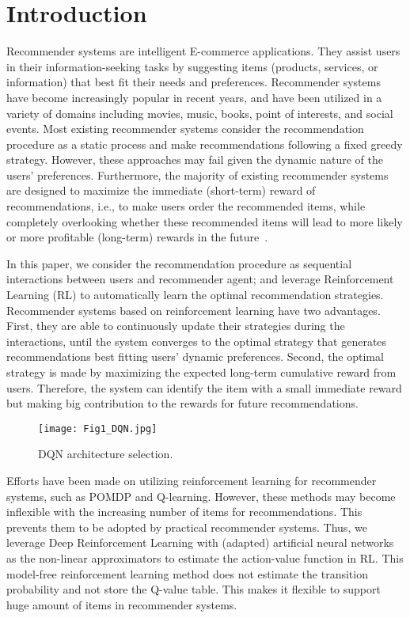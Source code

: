 \section{Introduction}
\label{sec:introduction}
Recommender systems are intelligent E-commerce applications. They assist users in their information-seeking tasks by suggesting items (products, services, or information) that best fit their needs and preferences. Recommender systems have become increasingly popular in recent years, and have been utilized in a variety of domains including movies, music, books, point of interests, and social events\cite{zhao2019model,resnick1997recommender,ricci2011introduction,zhao2016exploring,zhao2018recommendations,zhao2018deep,zhao2018reinforcement,guo2016cosolorec}. Most existing recommender systems consider the recommendation procedure as a static process and make recommendations following a fixed greedy strategy. However, these approaches may fail given the dynamic nature of the users' preferences. Furthermore, the majority of existing recommender systems are designed to maximize the immediate (short-term) reward of recommendations, i.e., to make users order the recommended items, while completely overlooking whether these recommended items will lead to more likely or more profitable (long-term) rewards in the future~\cite{shani2005mdp}. 

In this paper, we consider the recommendation procedure as sequential interactions between users and recommender agent; and leverage Reinforcement Learning (RL) to automatically learn the optimal recommendation strategies. Recommender systems based on reinforcement learning have two advantages. First, they are able to continuously update their strategies during the interactions, until the system converges to the optimal strategy that generates recommendations best fitting users' dynamic preferences. Second, the optimal strategy is made by maximizing the expected long-term cumulative reward from users. Therefore, the system can identify the item with a small immediate reward but making big contribution to the rewards for future recommendations.

\begin{figure*}
	\centering
	\texttt{[image: Fig1\_DQN.jpg]}
	\caption{DQN architecture selection.}
	\label{fig:selection}
\end{figure*}

Efforts have been made on utilizing reinforcement learning for recommender systems, such as POMDP\cite{shani2005mdp} and Q-learning\cite{taghipour2008hybrid}. However, these methods may become inflexible with the increasing number of items for recommendations. This prevents them to be adopted by practical recommender systems. Thus, we leverage Deep Reinforcement Learning\cite{lillicrap2015continuous} with (adapted) artificial neural networks as the non-linear approximators to estimate the action-value function in RL. This model-free reinforcement learning method does not estimate the transition probability and not store the Q-value table. This makes it flexible to support huge amount of items in recommender systems. 

